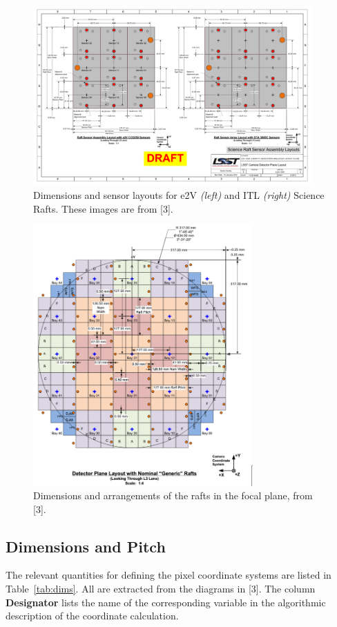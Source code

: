 \documentclass{article}[12pt]
\begin{document}
{\begin{figure}
\centering
    \includegraphics[width=0.95\textwidth]{raft_layout.pdf}
    \caption{Dimensions and sensor layouts for e2V {\it (left)} and ITL {\it (right)} Science Rafts.  These images are from [3].}
    \label{fig:raft}
\end{figure}

\begin{figure}
\centering
    \includegraphics[width=0.75\textwidth]{focal_plane_layout.png}
    \caption{Dimensions and arrangements of the rafts in the focal plane, from [3].}
    \label{fig:focalplane}
\end{figure}

\subsection{Dimensions and Pitch}
The relevant quantities for defining the pixel coordinate systems are listed in Table~\ref{tab:dims}.  All are extracted from the diagrams in [3].  The column {\bf Designator} lists the name of the corresponding variable in the algorithmic description of the coordinate calculation.  

}
\end{document}
